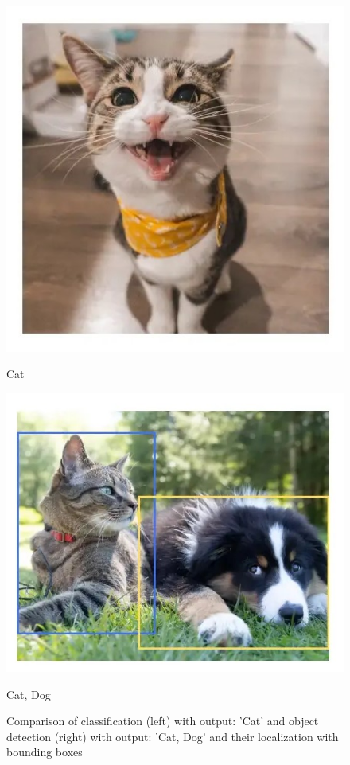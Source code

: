 	\begin{figure}[ht]
		\centering
		\begin{minipage}{0.4\textwidth}
			\centering
			\includegraphics[width=0.7\linewidth]{images/cat_class.jpg}
				\caption*{Cat}
			\label{fig:justcat}
		\end{minipage}%
		\begin{minipage}{0.48\textwidth}
			\centering
			\includegraphics[width=0.7\linewidth]{images/catanddog_detect.jpg}
				\caption*{Cat, Dog}
			\label{fig:catanddog}
		\end{minipage}
		\caption{Comparison of classification (left) with output: 'Cat' and object detection (right) with output: 'Cat, Dog' and their localization with bounding boxes }
		\label{fig:both_figures_class_detect} %
	\end{figure}
	
